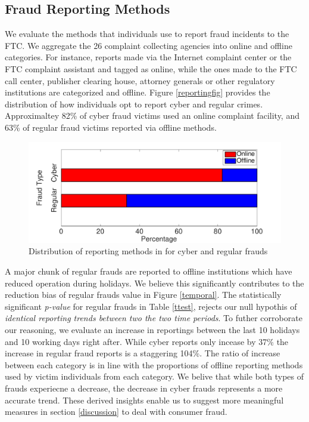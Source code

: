 \documentclass[conference]{IEEEtran}
\begin{document}
\subsection{Fraud Reporting Methods}\label{reportingmethods}
We evaluate the methods that individuals use to report fraud incidents to the FTC. We aggregate the 26 complaint collecting agencies into online and offline categories. For instance, reports made via the Internet complaint center or the FTC complaint assistant and tagged as online, while the ones made to the FTC call center, publisher clearing house, attorney generals or other regulatory institutions are categorized and offline. Figure \ref{reportingfig} provides the distribution of how individuals opt to report cyber and regular crimes. Approximaltey 82\% of cyber fraud victims used an online complaint facility, and 63\% of regular fraud victims reported via offline methods.


 \begin{figure}[b]
\centering
  \includegraphics[scale=0.35]{graphics/reporting_methods.pdf}
  \caption{Distribution of reporting methods in for cyber and regular frauds}
  \label{cdffig}
\end{figure}

A major chunk of regular frauds are reported to offline institutions which have reduced operation during holidays. We believe this significantly contributes to the reduction bias of regular frauds value in Figure \ref{temporal}. The statistically significant \emph{p-value} for regular frauds in Table \ref{ttest}, rejects our null hypothis of \emph{identical reporting trends between two the two time periods}. To futher corroborate our reasoning, we evaluate an increase in reportings between the last 10 holidays and 10 working days right after. While cyber reports only incease by 37\% the increase in regular fraud reports is a staggering 104\%. The ratio of increase between each category is in line with the proportions of offline reporting  methods used by victim individuals from each category. We belive that while both types of frauds experiecne a decrease, the decrease in cyber frauds represents a more accurate trend. These derived insights enable us to suggest more meaningful measures in section \ref{discussion} to deal with consumer fraud.
\end{document}

